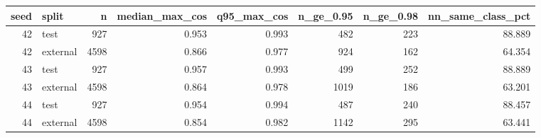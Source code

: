 \begin{tabular}{rlrrrrrr}
\toprule
seed & split & n & median\_max\_cos & q95\_max\_cos & n\_ge\_0.95 & n\_ge\_0.98 & nn\_same\_class\_pct \\
\midrule
42 & test & 927 & 0.953 & 0.993 & 482 & 223 & 88.889 \\
42 & external & 4598 & 0.866 & 0.977 & 924 & 162 & 64.354 \\
43 & test & 927 & 0.957 & 0.993 & 499 & 252 & 88.889 \\
43 & external & 4598 & 0.864 & 0.978 & 1019 & 186 & 63.201 \\
44 & test & 927 & 0.954 & 0.994 & 487 & 240 & 88.457 \\
44 & external & 4598 & 0.854 & 0.982 & 1142 & 295 & 63.441 \\
\bottomrule
\end{tabular}
